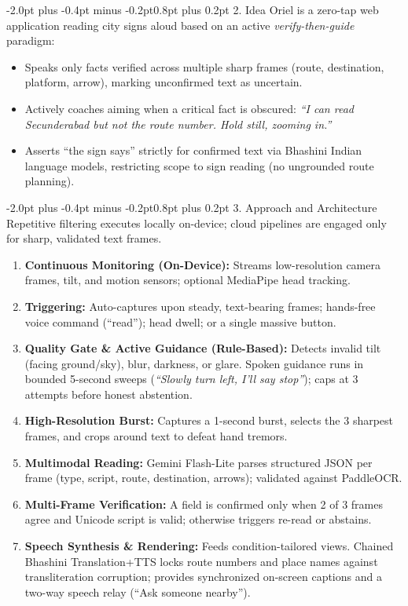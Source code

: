 \documentclass[10pt,a4paper]{article}
\makeatletter
\renewcommand{\section}{\@startsection{section}{1}{\z@}%
  {-2.0pt plus -0.4pt minus -0.2pt}{0.8pt plus 0.2pt}%
  {\normalfont\footnotesize\bfseries\scshape}}
\makeatother
\begin{document}
\vspace{-2pt}
\section{2. Idea}
Oriel is a zero-tap web application reading city signs aloud based on an active \textit{verify-then-guide} paradigm:
\begin{itemize}\setlength{\itemsep}{0.2pt}\setlength{\topsep}{0.2pt}\setlength{\leftmargin}{1.1em}
  \item Speaks only facts verified across multiple sharp frames (route, destination, platform, arrow), marking unconfirmed text as uncertain.
  \item Actively coaches aiming when a critical fact is obscured: \textit{``I can read Secunderabad but not the route number. Hold still, zooming in.''}
  \item Asserts ``the sign says'' strictly for confirmed text via Bhashini Indian language models, restricting scope to sign reading (no ungrounded route planning).
\end{itemize}

\vspace{-2pt}
\section{3. Approach and Architecture}
Repetitive filtering executes locally on-device; cloud pipelines are engaged only for sharp, validated text frames.
\begin{enumerate}\setlength{\itemsep}{0.1pt}\setlength{\topsep}{0.1pt}\setlength{\parsep}{0pt}\setlength{\leftmargin}{1.1em}
  \item \textbf{Continuous Monitoring (On-Device):} Streams low-resolution camera frames, tilt, and motion sensors; optional MediaPipe head tracking.
  \item \textbf{Triggering:} Auto-captures upon steady, text-bearing frames; hands-free voice command (``read''); head dwell; or a single massive button.
  \item \textbf{Quality Gate \& Active Guidance (Rule-Based):} Detects invalid tilt (facing ground/sky), blur, darkness, or glare. Spoken guidance runs in bounded 5-second sweeps (\textit{``Slowly turn left, I'll say stop''}); caps at 3 attempts before honest abstention.
  \item \textbf{High-Resolution Burst:} Captures a 1-second burst, selects the 3 sharpest frames, and crops around text to defeat hand tremors.
  \item \textbf{Multimodal Reading:} Gemini Flash-Lite parses structured JSON per frame (type, script, route, destination, arrows); validated against PaddleOCR.
  \item \textbf{Multi-Frame Verification:} A field is confirmed only when 2 of 3 frames agree and Unicode script is valid; otherwise triggers re-read or abstains.
  \item \textbf{Speech Synthesis \& Rendering:} Feeds condition-tailored views. Chained Bhashini Translation+TTS locks route numbers and place names against transliteration corruption; provides synchronized on-screen captions and a two-way speech relay (``Ask someone nearby'').
\end{enumerate}
\end{document}
